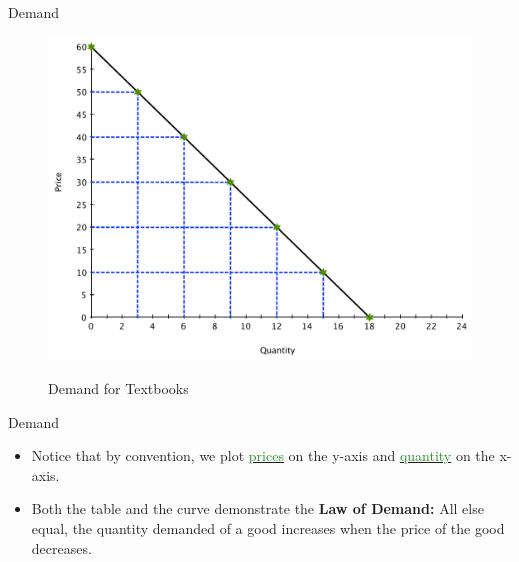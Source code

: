 \documentclass[xcolor={dvipsnames},pdf, hyperref={colorlinks=true, citecolor=ForestGreen, linkcolor=BlueViolet, urlcolor=Magenta}]{beamer}
\theoremstyle{definition}
\newcommand{\defn}[1]{\textbf{#1}}
\newcommand{\ddp}[1]{{\textcolor{ForestGreen}{#1}}}
\newcommand{\dd}[1]{{\underline{\textcolor{ForestGreen}{#1}}}}
\begin{document}
\begin{frame}[b]{Demand}
	

	\begin{figure}[H]
		\centering
		\ddp{\includegraphics[scale=.30]{plot7.pdf}}
		\caption{Demand for Textbooks}
	\end{figure}
\end{frame}


\begin{frame}{Demand}
\begin{itemize}
	\item Notice that by convention, we plot \dd{prices} on the y-axis and \dd{quantity} on the x-axis.
	\item Both the table and the curve demonstrate the \defn{Law of Demand:} All else equal, the quantity demanded of a good increases when the price of the good decreases.
\end{itemize}
\end{frame}
\end{document}
